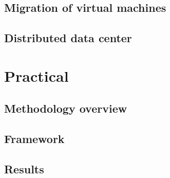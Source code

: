 \documentclass[12pt,oneside,a4paper]{report} %
\begin{document}
	\chapter{Migration of virtual machines}

	\chapter{Distributed data center}

	\pagebreak

\part{Practical}
		
	\chapter{Methodology overview}
	\chapter{Framework}
	\chapter{Results}


\printglossary[type=acronym,title=List of Abbreviations,toctitle=List of Abbreviations]

\newpage
{} \label{listoffig}
\listoffigures

\newpage
{} \label{listoftab}
\listoftables
\cleardoublepage

{}




\end{document}
